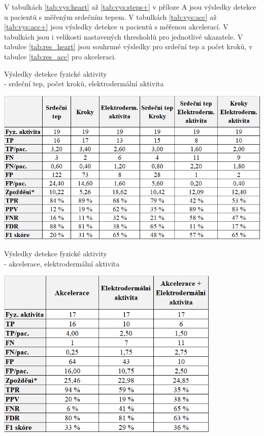 V tabulkách \ref{tab:vys:heart} až \ref{tab:vys:steps+} v příloze A jsou výsledky detekce u pacientů s měřeným srdečním tepem. V tabulkách \ref{tab:vys:acc} až \ref{tab:vys:acc+} jsou výsledky detekce u pacientů s měřenou akcelerací. V tabulkách jsou i velikosti nastavených thresholdů pro jednotlivé ukazatele. V tabulce \ref{tab:res_heart} jsou souhrnné výsledky pro srdeční tep a počet kroků, v tabulce \ref{tab:res_acc} pro akceleraci.

\begin{table}[H]
\caption{Výsledky detekce fyzické aktivity\\ - srdeční tep, počet kroků, elektrodermální aktivita}
\label{tab:res_heart}
\includegraphics[width=1\textwidth]{img/vysledky/pa/vysledky 1.png}
\end{table}
\vspace*{-5mm}
\begin{table}[H]
\caption{Výsledky detekce fyzické aktivity\\ - akcelerace, elektrodermální aktivita}
\label{tab:res_acc}
\includegraphics[width=0.8\textwidth]{img/vysledky/pa/vysledky 2.png}
\end{table}

